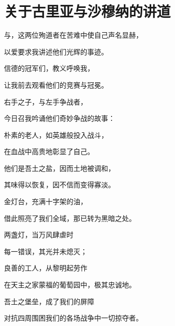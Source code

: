 
\chapter{关于古里亚与沙穆纳的讲道}


与，这两位殉道者在苦难中使自己声名显赫，\par

以爱要求我讲述他们光辉的事迹。\par

信德的冠军们，教义呼唤我，\par

让我前去观看他们的竞赛与冠冕。\par

右手之子，与左手争战者，\par

今日召我吟诵他们奇妙争战的故事：\par

朴素的老人，如英雄般投入战斗，\par

在血战中高贵地彰显了自己。\par

他们是吾土之盐，因而土地被调和，\par

其味得以恢复，因不信而变得寡淡。\par

金灯台，充满十字架的油，\par

借此照亮了我们全域，那已转为黑暗之处。\par

两盏灯，当万风肆虐时\par

每一错误，其光并未熄灭；\par

良善的工人，从黎明起劳作\par

在天主之家蒙福的葡萄园中，极其忠诚地。\par

吾土之堡垒，成了我们的屏障\par

对抗四周围困我们的各场战争中一切掠夺者。\par

